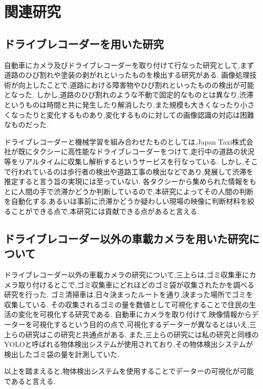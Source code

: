 \chapter{関連研究}
\section{ドライブレコーダーを用いた研究}
自動車にカメラ及びドライブレコーダーを取り付けて行なった研究として,まず道路のひび割れや塗装の剥がれといったものを検出する研究\cite{全邦釘2017ディープラーニングおよび}がある.
画像処理技術が向上したことで,道路における障害物やひび割れといったものの検出が可能となった.
しかし,道路のひび割れのような不動で固定的なものとは異なり,渋滞というものは時間と共に発生したり解消したり,また規模も大きくなったり小さくなったりと変化するものあり,変化するものに対しての画像認識の対応は困難なものだった.

ドライブレコーダーと機械学習を組み合わせたものとしては,Japan Taxi株式会社が既にタクシーに高性能なドライブレコーダーをつけて,走行中の道路の状況等をリアルタイムに収集し解析するというサービスを行なっている.
しかし,そこで行われているのは歩行者の検出や道路工事の検出などであり,発展して渋滞を推定すると言う旨の実現には至っていない.
各タクシーから集められた情報をもとに人間の手で渋滞かどうか判断しているので,本研究によってその人間の判断を自動化する,あるいは事前に渋滞かどうか疑わしい現場の映像に判断材料を絞ることができる点で,本研究には貢献できる点があると言える.

\section{ドライブレコーダー以外の車載カメラを用いた研究について}
ドライブレコーダー以外の車載カメラの研究について,三上ら\cite{三上量弘2020deepcounter}は,ゴミ収集車にカメラ取り付けるとこで,ゴミ収集車にどれほどのゴミ袋が収集されたかを調べる研究を行った.
ゴミ清掃車は,日々決まったルートを通り,決まった場所でゴミを収集している.
その収集されるゴミの量を数値として可視化することで住民の生活の変化を可視化する研究である.
自動車にカメラを取り付けて,映像情報からデーターを可視化するという目的の点で,可視化するデーターが異なるとはいえ,三上らの研究はこの研究と共通点がある.
また,三上らの研究には私の研究と同様のYOLOと呼ばれる物体検出システムが使用されており,その物体検出システムが検出したゴミ袋の量を計測していた.

以上を踏まえると,物体検出システムを使用することでデーターの可視化が可能であると言える.

